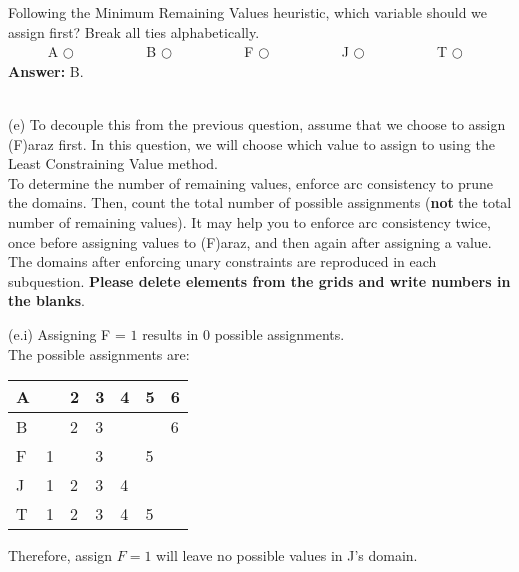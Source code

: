 \documentclass{article}
\begin{document}
\noindent Following the Minimum Remaining Values heuristic, which variable should we assign first? Break all ties alphabetically.\\
\indent ~~~~~ A $\bigcirc$ ~~~~~~~~~  B $\bigcirc$ ~~~~~~~~~  F $\bigcirc$ ~~~~~~~~~  J $\bigcirc$ ~~~~~~~~~  T $\bigcirc$
~\\

\textbf{Answer:} B.

~\\

\noindent (e) To decouple this from the previous question, assume that we choose to assign (F)araz first. In this question, we will choose which value to assign to using the Least Constraining Value method.\\


\noindent To determine the number of remaining values, enforce arc consistency to prune the domains. Then, count the total number of possible assignments (\textbf{not} the total number of remaining values). It may help you to enforce arc consistency twice, once before assigning values to (F)araz, and then again after assigning a value.\\


\noindent The domains after enforcing unary constraints are reproduced in each subquestion. \textbf{Please delete elements from the grids and write numbers in the blanks}. 
\newpage

\noindent(e.i) Assigning F = $1$ results in $0$ possible assignments. \\
\noindent The possible assignments are: \\
\renewcommand\arraystretch{1.5}
\begin{table}[tbh!]
\begin{center}
    \begin{tabular}{|p{1cm}| p{1cm}| p{1cm} | p{1cm}| p{1cm}| p{1cm}| p{1cm}|}
\hline
    A &  & 2 & 3 & 4 & 5 & 6  \\ \hline
    B &  & 2 & 3 &   &   & 6  \\ \hline
    F & 1 &  & 3 &   & 5 &   \\ \hline
    J & 1 & 2 & 3 & 4  &  &   \\ \hline
    T & 1 & 2 & 3 & 4  & 5 &   \\ \hline
\end{tabular}
\end{center}
\end{table}

Therefore, assign $F=1$ will leave no possible values in J's domain. \\
\end{document}
